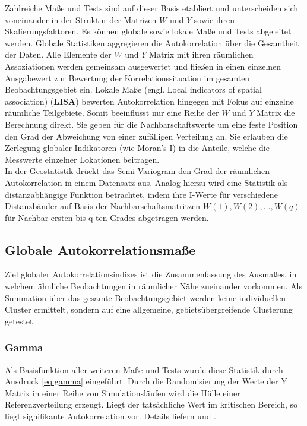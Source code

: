 Zahlreiche Maße und Tests sind auf dieser Basis etabliert und unterscheiden sich voneinander in der Struktur der Matrizen $W$ und $Y$ sowie ihren Skalierungsfaktoren. 
Es können globale sowie lokale Maße und Tests abgeleitet werden. 
Globale Statistiken aggregieren die Autokorrelation über die Gesamtheit der Daten. 
Alle Elemente der $W$ und $Y$ Matrix mit ihren räumlichen Assoziationen werden gemeinsam ausgewertet und 
fließen in einen einzelnen Ausgabewert zur Bewertung der Korrelationssituation im gesamten Beobachtungsgebiet ein.
Lokale Maße (engl. Local indicators of spatial association) ($\mathbf{LISA}$) bewerten Autokorrelation hingegen mit Fokus auf einzelne räumliche Teilgebiete. 
Somit beeinflusst nur eine Reihe der $W$ und $Y$ Matrix die Berechnung direkt. \cite[S. 262]{fischer_handbook_2010}
Sie geben für die Nachbarschaftswerte um eine feste Position den Grad der Abweichung von einer zufälligen Verteilung an. %
Sie erlauben die Zerlegung globaler Indikatoren (wie Moran’s I) in die Anteile, welche die Messwerte einzelner Lokationen beitragen. \cite[S.94]{anselin_local_1995}\\


In der Geostatistik drückt das Semi-Variogram den Grad der räumlichen Autokorrelation in einem Datensatz aus. 
Analog hierzu wird eine Statistik als distanzabhängige Funktion betrachtet, indem ihre I-Werte für verschiedene Distanzbänder auf Basis der 
Nachbarschaftsmatritzen $W(1), W(2),\ldots,W(q)$ für Nachbar ersten bis q-ten Grades abgetragen werden.

\subsection{Globale Autokorrelationsmaße}
\label{ch:autocorrelation-GISA}
Ziel globaler Autokorrelationsindizes ist die Zusammenfassung des Ausmaßes, in welchem ähnliche Beobachtungen in räumlicher Nähe zueinander vorkommen.
Als Summation über das gesamte Beobachtungsgebiet werden keine individuellen Cluster ermittelt, sondern auf eine allgemeine, gebietsübergreifende Clusterung getestet.

\subsubsection{Gamma}
Als Basisfunktion aller weiteren Maße und Tests wurde diese Statistik durch Ausdruck \ref{eq:gamma} eingeführt. 
Durch die Randomisierung der Werte der Y Matrix in einer Reihe von Simulationsläufen wird die Hülle einer Referenzverteilung erzeugt. 
Liegt der tatsächliche Wert im kritischen Bereich, so liegt signifikante Autokorrelation vor.
Details liefern \cite[S. 262]{fischer_handbook_2010} und \cite[S. 15]{schabenberger_statistical_2005}.


